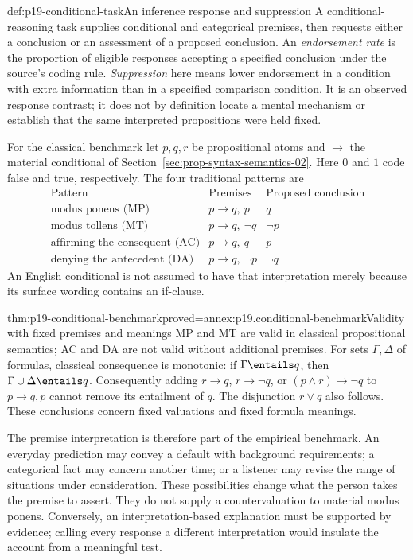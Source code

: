 \begin{hbdefinition}{def:p19-conditional-task}{An inference response and suppression}
A conditional-reasoning task supplies conditional and categorical premises,
then requests either a conclusion or an assessment of a proposed conclusion.
An \emph{endorsement rate} is the proportion of eligible responses accepting
a specified conclusion under the source's coding rule. \emph{Suppression}
here means lower endorsement in a condition with extra information than
in a specified comparison condition. It is an observed response contrast;
it does not by definition locate a mental mechanism or establish that the
same interpreted propositions were held fixed.

For the classical benchmark let \(p,q,r\) be propositional atoms and
\(\to\) the material conditional of Section~\ref{sec:prop-syntax-semantics-02}.
Here \(0\) and \(1\) code false and true, respectively. The four
traditional patterns are
\[
\begin{array}{c|c|c}
 \text{Pattern}&\text{Premises}&\text{Proposed conclusion}\\\hline
 \text{modus ponens (MP)}&p\to q,\ p&q\\
 \text{modus tollens (MT)}&p\to q,\ \neg q&\neg p\\
 \text{affirming the consequent (AC)}&p\to q,\ q&p\\
 \text{denying the antecedent (DA)}&p\to q,\ \neg p&\neg q
\end{array}
\]
An English conditional is not assumed to have that interpretation merely
because its surface wording contains an if-clause.
\end{hbdefinition}

\begin{hblemma}{thm:p19-conditional-benchmark}{proved=annex:p19.conditional-benchmark}{Validity with fixed premises and meanings}
MP and MT are valid in classical propositional semantics; AC and DA are
not valid without additional premises. For sets \(\Gamma,\Delta\) of formulas,
classical consequence is monotonic:
if \(\Gamma\entails q\), then \(\Gamma\cup\Delta\entails q\).
Consequently adding \(r\to q\), \(r\to\neg q\), or
\((p\land r)\to\neg q\) to \(p\to q,p\) cannot remove its entailment
of \(q\). The disjunction \(r\lor q\) also follows. These conclusions
concern fixed valuations and fixed formula meanings.
\end{hblemma}

The premise interpretation is therefore part of the empirical benchmark.
An everyday prediction may convey a default with background requirements;
a categorical fact may concern another time; or a listener may revise the
range of situations under consideration. These possibilities change what
the person takes the premise to assert. They do not supply a countervaluation
to material modus ponens. Conversely, an interpretation-based explanation
must be supported by evidence; calling every response a different
interpretation would insulate the account from a meaningful test.

